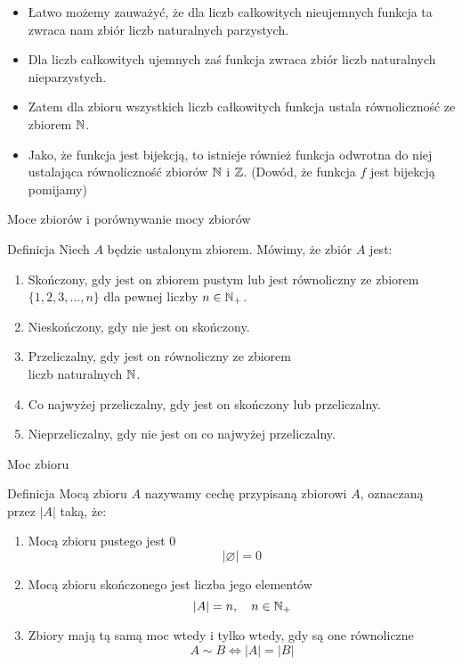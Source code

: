 \documentclass[trans]{beamer}
\begin{document}
\begin{frame}
	\begin{itemize}
		\item<1-> Łatwo możemy zauważyć, że dla liczb całkowitych nieujemnych funkcja ta zwraca nam zbiór liczb naturalnych parzystych.
		\item<2-> Dla liczb całkowitych ujemnych zaś funkcja zwraca zbiór liczb naturalnych nieparzystych.
		\item<3-> Zatem dla zbioru wszystkich liczb całkowitych funkcja ustala równoliczność ze zbiorem $\mathbb{N}$.
		\item<4-> Jako, że funkcja jest bijekcją, to istnieje również funkcja odwrotna do niej ustalająca równoliczność zbiorów $\mathbb{N}$ i $\mathbb{Z}$. (Dowód, że funkcja $f$ jest bijekcją pomijamy)
	\end{itemize}
\end{frame}

\begin{frame}{Moce zbiorów i porównywanie mocy zbiorów}
	\begin{block}{Definicja}
		Niech $A$ będzie ustalonym zbiorem. Mówimy, że zbiór $A$ jest:
		\begin{enumerate}
			\item<1-> \alert{Skończony}, gdy jest on zbiorem pustym lub jest równoliczny ze
					  zbiorem $\{ 1,2,3,...,n \}$ dla pewnej liczby $n \in \mathbb{N}_+$.
			\item<2-> \alert{Nieskończony}, gdy nie jest on skończony.
			\item<3-> \alert{Przeliczalny}, gdy jest on równoliczny ze zbiorem \\ liczb naturalnych
					  $\mathbb{N}$.
			\item<4-> \alert{Co najwyżej przeliczalny}, gdy jest on skończony lub przeliczalny.
			\item<5-> \alert{Nieprzeliczalny}, gdy nie jest on co najwyżej przeliczalny. 
		\end{enumerate}
	\end{block}
\end{frame}

\begin{frame}{Moc zbioru}
	\begin{block}{Definicja}
		Mocą zbioru $A$ nazywamy cechę przypisaną zbiorowi $A$, oznaczaną przez $|A|$ taką, że:
		\begin{enumerate}
			\item<1-> Mocą zbioru pustego jest $0$ 
				  \[
					  |\varnothing| = 0 
				  \]
			\item<2-> Mocą zbioru skończonego jest liczba jego elementów
				  \[
					  |A| = n, \quad n \in \mathbb{N}_+
				  \]
			\item<3-> Zbiory mają tą samą moc wtedy i tylko wtedy, gdy są one równoliczne
				  \[
				  	  A \sim B \iff |A| = |B|
				  \]
		\end{enumerate}
	\end{block}
\end{frame}
\end{document}
